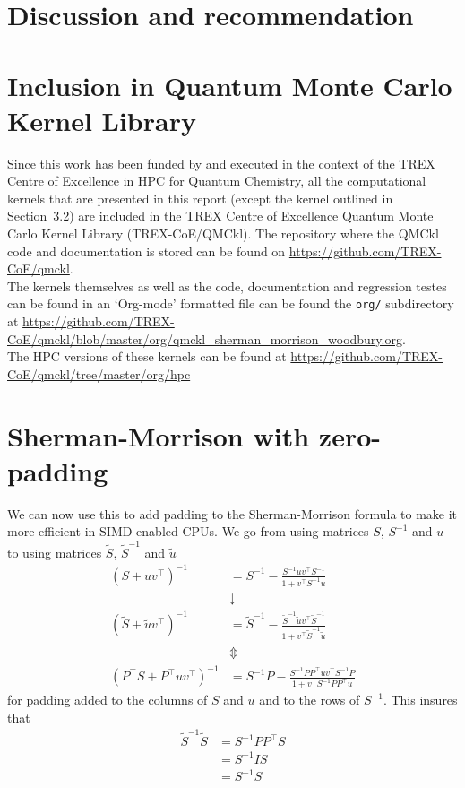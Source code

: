 \documentclass[11pt]{article}
\numberwithin{figure}{section}
\numberwithin{table}{section}
\begin{document}
  \section{Discussion and recommendation}
		
  \section{Inclusion in Quantum Monte Carlo Kernel Library}
    Since this work has been funded by and executed in the context of the TREX Centre of Excellence in HPC for Quantum Chemistry, all the computational kernels that are presented in this report (except the kernel outlined in Section~3.2) are included in the TREX Centre of Excellence Quantum Monte Carlo Kernel Library (TREX-CoE/QMCkl). The repository where the QMCkl code and documentation is stored can be found on \url{https://github.com/TREX-CoE/qmckl}.\\
    
    The kernels themselves as well as the code, documentation and regression testes can be found in an `Org-mode' formatted file can be found the \texttt{org/} subdirectory at \url{https://github.com/TREX-CoE/qmckl/blob/master/org/qmckl_sherman_morrison_woodbury.org}.\\
    
    The HPC versions of these kernels can be found at \url{https://github.com/TREX-CoE/qmckl/tree/master/org/hpc}
    
    
    


  \newpage
  \appendix

\section{Sherman-Morrison with zero-padding}

We can now use this to add padding to the Sherman-Morrison formula to make it more efficient in SIMD enabled CPUs. We go from using matrices $S$, $S^{-1}$ and $u$ to using matrices $\widetilde{S}$, $\widetilde{S}^{-1}$ and $\widetilde{u}$
\begin{align}
	\left(S+uv^\top \right)^{-1} &= S^{-1}-\frac{S^{-1}uv^\top S^{-1}}{1+v^\top S^{-1}u} \\
								&\downarrow \\
	\left(\widetilde{S}+\widetilde{u}v^\top \right)^{-1} &= \widetilde{S}^{-1}-\frac{\widetilde{S}^{-1}\widetilde{u}v^\top \widetilde{S}^{-1}}{1+v^\top \widetilde{S}^{-1}\widetilde{u}} \\
								&\Updownarrow \\
	\left(P^\top S+P^\top uv^\top \right)^{-1} &= S^{-1}P-\frac{S^{-1}PP^\top uv^\top S^{-1}P}{1+v^\top S^{-1}PP^\top u}	
\end{align}
for padding added to the columns of $S$ and $u$ and to the rows of $S^{-1}$. This insures that
\begin{align}
	\widetilde{S}^{-1}\widetilde{S} &= S^{-1}PP^\top S \\
									&= S^{-1}IS \\
									&= S^{-1}S
\end{align}
\end{document}

